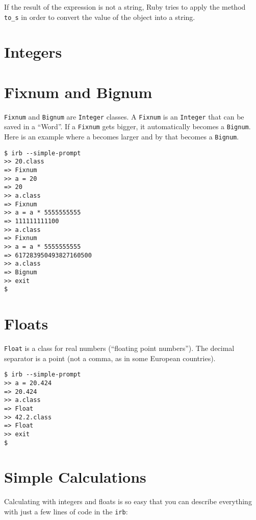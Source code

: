 \documentclass[a4paper]{book}
\begin{document}
If the result of the expression is not a string, Ruby tries to apply the method \texttt{to\_s} in order to convert the value of the object into a string.

\section{Integers}\label{integers}

\section{Fixnum and Bignum}\label{fixnum-and-bignum}

\texttt{Fixnum} and \texttt{Bignum} are \texttt{Integer} classes. A \texttt{Fixnum} is an \texttt{Integer} that can be saved in a “Word”. If a \texttt{Fixnum} gets bigger, it automatically becomes a \texttt{Bignum}. Here is an example where a becomes larger and by that becomes a \texttt{Bignum}.

\begin{shaded}\begin{verbatim}
$ irb --simple-prompt
>> 20.class
=> Fixnum
>> a = 20
=> 20
>> a.class
=> Fixnum
>> a = a * 5555555555
=> 111111111100
>> a.class
=> Fixnum
>> a = a * 5555555555
=> 617283950493827160500
>> a.class
=> Bignum
>> exit
$
\end{verbatim}\end{shaded}

\section{Floats}\label{floats}

\texttt{Float} is a class for real numbers (“floating point numbers”). The decimal separator is a point (not a comma, as in some European countries).

\begin{shaded}\begin{verbatim}
$ irb --simple-prompt
>> a = 20.424
=> 20.424
>> a.class
=> Float
>> 42.2.class
=> Float
>> exit
$
\end{verbatim}\end{shaded}

\section{Simple Calculations}\label{simple-calculations}

Calculating with integers and floats is so easy that you can describe everything with just a few lines of code in the \texttt{irb}:
\end{document}
